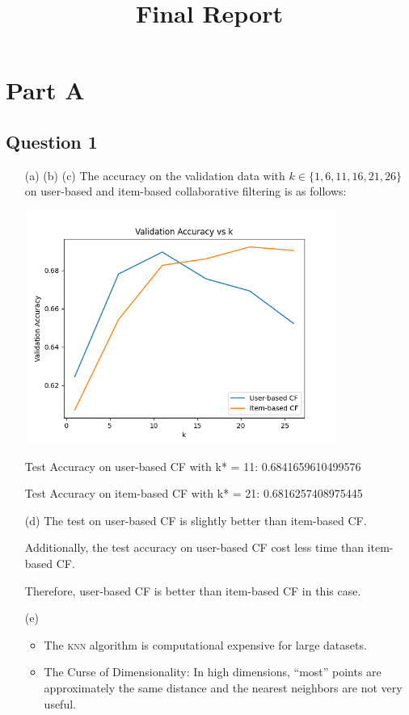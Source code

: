 \documentclass{article}
\title{Final Report}
\date{\vspace{-7.5ex}}
\begin{document}
\maketitle
\thispagestyle{fancy}

\section*{Part A}

\subsection*{Question 1}

\begin{enumerate}
    \item [(a) (b) (c)] The accuracy on the validation data with $k \in \{1, 6, 11, 16, 21, 26\}$ on user-based and item-based collaborative filtering is as follows:
    \begin{center}
        \includegraphics[width=0.8\textwidth]{q1.png}
    \end{center}
    Test Accuracy on user-based CF with k* = 11: 0.6841659610499576

    Test Accuracy on item-based CF with k* = 21: 0.6816257408975445

    \item [(d)] The test on user-based CF is slightly better than item-based CF.
    
    Additionally, the test accuracy on user-based CF cost less time than item-based CF.

    Therefore, user-based CF is better than item-based CF in this case.

    \item [(e)] 
    \begin{itemize}
        \item The \textsc{knn} algorithm is computational expensive for large datasets.
        \item The Curse of Dimensionality: In high dimensions, ``most'' points are approximately the same distance and the nearest neighbors are not very useful.
    \end{itemize}
\end{enumerate}
\end{document}
